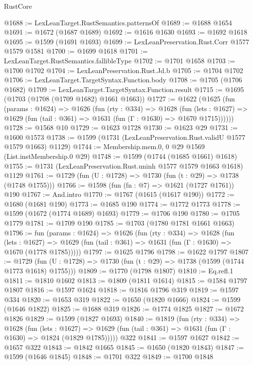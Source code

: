 \begin{lexlean}{RustCore}
\begin{coremodule}
@1688 := LexLeanTarget.RustSemantics.patternsOf
@1689 := @1688 @1654
@1691 := @1672 (@1687 @1689)
@1692 := @1616 @1630
@1693 := @1692 @1618
@1695 := @1599 (@1691 @1693)
@1699 := LexLeanPreservation.Rust.Corr @1577 @1579 @1581
@1700 := @1699 @1618
@1701 := LexLeanTarget.RustSemantics.fallibleType
@1702 := @1701 @1658
@1703 := @1700 @1702
@1704 := LexLeanPreservation.Rust.Jd.b
@1705 := @1704 @1702
@1706 := LexLeanTarget.TargetSyntax.Function.body
@1708 := @1705 (@1706 @1682)
@1709 := LexLeanTarget.TargetSyntax.Function.result
@1715 := @1695 (@1703 (@1708 (@1709 @1682) @1661 @1663))
@1727 := @1622
    (@1625
      (fun (params : @1624) =>
      @1626
        (fun (rty : @334) =>
        @1628
          (fun (lets : @1627) =>
          @1629 (fun (tail : @361) => @1631 (fun (Γ : @1630) => @1670 @1715))))))
@1728 := @1568 @10
@1729 := @1623 @1728
@1730 := @1623 @29
@1731 := @1600 @1573
@1738 := @1599 (@1731 (LexLeanPreservation.Rust.validU @1577 @1579 @1663) @1129)
@1744 := Membership.mem.{0, 0} @29 @1569 (List.instMembership.{0} @29)
@1748 := @1599 (@1744 (@1685 @1661) @1618)
@1755 := @1731 (LexLeanPreservation.Rust.uninh @1577 @1579 @1663 @1618) @1129
@1761 := @1729 (fun (U : @1728) => @1730 (fun (t : @29) => @1738 (@1748 @1755)))
@1766 := @1598 (fun (fn : @7) => @1621 (@1727 @1761)) @190
@1767 := And.intro
@1770 := @1767 (@1615 (@1617 @190))
@1772 := @1680 (@1681 @190)
@1773 := @1685 @190
@1774 := @1772 @1773
@1778 := @1599 (@1672 (@1774 @1689) @1693)
@1779 := @1706 @190
@1780 := @1705 @1779
@1781 := @1709 @190
@1785 := @1703 (@1780 @1781 @1661 @1663)
@1796 := fun (params : @1624) =>
  @1626
    (fun (rty : @334) =>
    @1628
      (fun (lets : @1627) =>
      @1629 (fun (tail : @361) => @1631 (fun (Γ : @1630) => @1670 (@1778 @1785)))))
@1797 := @1625 @1796
@1798 := @1622 @1797
@1807 := @1729 (fun (U : @1728) => @1730 (fun (t : @29) => @1738 (@1599 (@1744 @1773 @1618) @1755)))
@1809 := @1770 (@1798 @1807)
@1810 := Eq.refl.{1}
@1811 := @1810 @1602
@1813 := @1809 (@1811 @1614)
@1815 := @1584 @1797 @1807
@1816 := @1597 @1624
@1818 := @1816 @1796 @319
@1819 := @1597 @334
@1820 := @1653 @319
@1822 := @1650 (@1820 @1666)
@1824 := @1599 (@1646 @1822)
@1825 := @1688 @319
@1826 := @1774 @1825
@1827 := @1672 @1826
@1829 := @1599 (@1827 @1693)
@1840 := @1819
    (fun (rty : @334) =>
    @1628
      (fun (lets : @1627) =>
      @1629 (fun (tail : @361) => @1631 (fun (Γ : @1630) => @1824 (@1829 @1785)))))
    @322
@1841 := @1597 @1627
@1842 := @1657 @322
@1843 := @1842 @1665
@1845 := @1650 (@1820 @1843)
@1847 := @1599 (@1646 @1845)
@1848 := @1701 @322
@1849 := @1700 @1848

\end{coremodule}
\end{lexlean}
